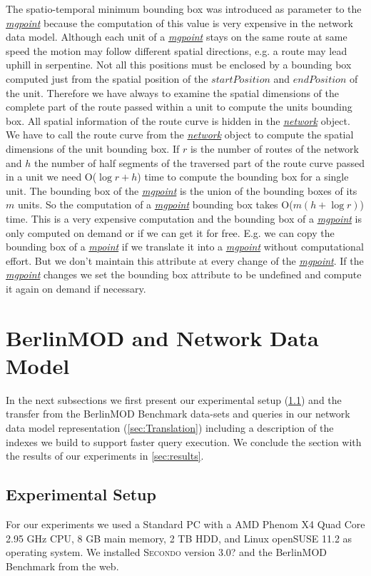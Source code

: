 \documentclass[a4paper]{article}
\newcommand{\secondo}{\textsc{Secondo}}
\newcommand{\bmodb} {BerlinMOD Benchmark}
\newcommand{\dt}[1]{\textsl{\underline{#1}}}
\newcommand{\secver}{3.0?}
\begin{document}
{The spatio-temporal minimum bounding box was introduced as parameter to the
\dt{mgpoint} because the computation of this value is very expensive in the
network data model. Although each unit of a \dt{mgpoint} stays on the same route
at same speed the motion may follow different spatial directions, e.g. a route may
lead uphill in serpentine. Not all this positions must be enclosed by a bounding box
computed just from the spatial position of the $startPosition$ and $endPosition$
of the unit. Therefore we have always to examine the spatial dimensions of the
complete part of the route passed within a unit to compute the units bounding box.
All spatial information of the route curve is hidden in the \dt{network} object.
We have to call the route curve from the \dt{network} object to compute the
spatial dimensions of the unit bounding box. If $r$ is the number of routes
of the network and $h$ the number of half segments of the traversed part of
the route curve passed in a unit we need O($\log r + h$) time to
compute the bounding box for a single unit. The bounding box of the \dt{mgpoint}
 is the union of the bounding boxes of its $m$ units. So the computation of
a \dt{mgpoint} bounding box takes O($m(h + \log r)$) time. This is a
very expensive computation and the bounding box of a \dt{mgpoint} is only computed
 on  demand or if we can get it for free. E.g. we can copy the bounding box of a
\dt{mpoint} if we translate it into a \dt{mgpoint} without computational effort.
 But we don't maintain this attribute at every change of the \dt{mgpoint}. If the
\dt{mgpoint} changes we set the bounding box attribute to be undefined and compute
 it again on demand if necessary.
\section{BerlinMOD and Network Data Model}
\label{sec:bmodbNetDataMod}
In the next subsections we first present our experimental setup (\ref{sec:scenario})
 and the transfer from the \bmodb{} data-sets and queries in our network data model  representation (\ref{sec:Translation}) including a description of the indexes
we build to support faster query execution. We conclude the section with the
results of our experiments in \ref{sec:results}.
\subsection{Experimental Setup}
\label{sec:scenario}
For our experiments we used a Standard PC with a AMD Phenom X4 Quad Core 2.95 GHz CPU, 8 GB main memory, 2 TB HDD, and Linux openSUSE 11.2 as operating system. We installed \secondo{} version \secver{} and the \bmodb{} from the web.

}
\end{document}
